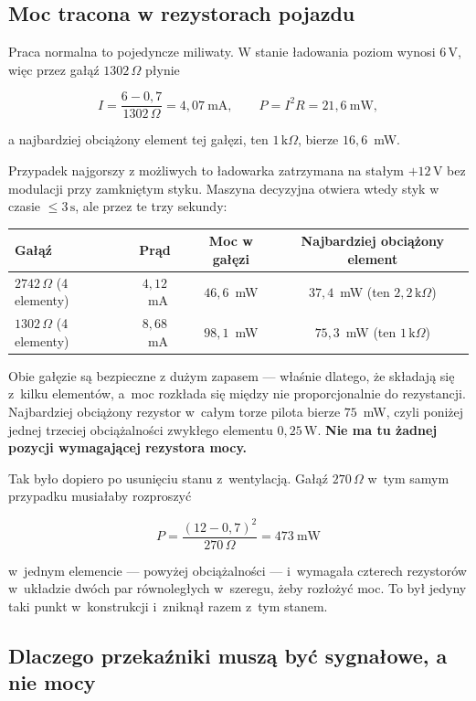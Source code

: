\documentclass[a4paper,11pt]{article}
\newcommand{\ohm}{\,\Omega}
\newcommand{\kohm}{\,\mathrm{k}\Omega}
\newcommand{\volt}{\,\mathrm{V}}
\newcommand{\watt}{\,\mathrm{W}}
\newcommand{\sek}{\,\mathrm{s}}
\begin{document}
\subsection{Moc tracona w rezystorach pojazdu}
\label{sec:moc}

Praca normalna to pojedyncze miliwaty. W stanie ładowania poziom wynosi $6\volt$,
więc przez gałąź $1302\ohm$ płynie

\[
I=\frac{6-0{,}7}{1302\ohm}=4{,}07\ \mathrm{mA},
\qquad
P=I^2R=21{,}6\ \mathrm{mW},
\]

a najbardziej obciążony element tej gałęzi, ten $1\kohm$, bierze $16{,}6$~mW.

Przypadek najgorszy z możliwych to ładowarka zatrzymana na stałym $+12\volt$ bez
modulacji przy zamkniętym styku. Maszyna decyzyjna otwiera wtedy styk w czasie
$\le3\sek$, ale przez te trzy sekundy:

\begin{center}
\begin{tabular}{lccc}
\toprule
Gałąź & Prąd & Moc w gałęzi & Najbardziej obciążony element \\
\midrule
$2742\ohm$ (4 elementy) & $4{,}12$~mA & $46{,}6$~mW & $37{,}4$~mW (ten $2{,}2\kohm$) \\
$1302\ohm$ (4 elementy) & $8{,}68$~mA & $98{,}1$~mW & $75{,}3$~mW (ten $1\kohm$) \\
\bottomrule
\end{tabular}
\end{center}

Obie gałęzie są bezpieczne z dużym zapasem --- właśnie dlatego, że składają się
z~kilku elementów, a~moc rozkłada się między nie proporcjonalnie do rezystancji.
Najbardziej obciążony rezystor w~całym torze pilota bierze $75$~mW, czyli poniżej
jednej trzeciej obciążalności zwykłego elementu $0{,}25\watt$. \textbf{Nie ma tu
żadnej pozycji wymagającej rezystora mocy.}

Tak było dopiero po usunięciu stanu z~wentylacją. Gałąź $270\ohm$ w~tym samym
przypadku musiałaby rozproszyć

\[
P=\frac{(12-0{,}7)^2}{270\ohm}=473\ \mathrm{mW}
\]

w~jednym elemencie --- powyżej obciążalności --- i~wymagała czterech rezystorów
w~układzie dwóch par równoległych w~szeregu, żeby rozłożyć moc. To był jedyny taki
punkt w~konstrukcji i~zniknął razem z~tym stanem.

\subsection{Dlaczego przekaźniki muszą być sygnałowe, a nie mocy}
\label{sec:przekazniki}
\end{document}
